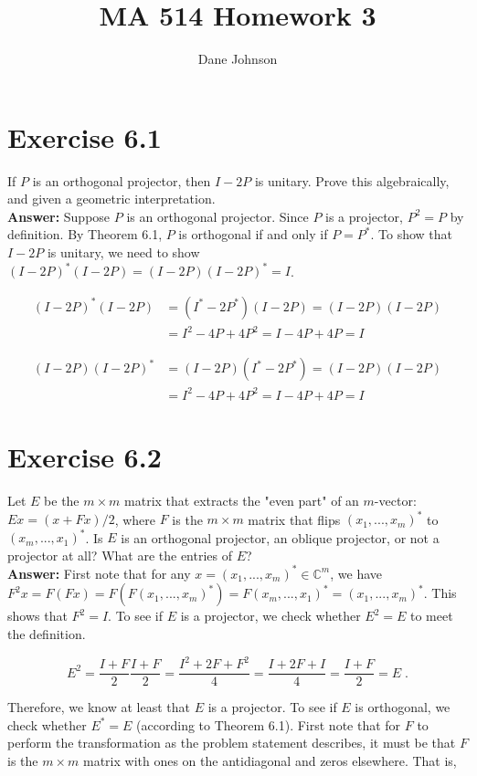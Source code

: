 \documentclass[11pt]{article}
\title{MA 514 Homework 3}
\author{Dane Johnson}
\begin{document}
\maketitle

\section*{Exercise 6.1}

If $P$ is an orthogonal projector, then $I-2P$ is unitary. Prove this algebraically, and given a geometric interpretation. \\

\textbf{Answer:} Suppose $P$ is an orthogonal projector. Since $P$ is a projector, $P^2 = P$ by definition. By Theorem 6.1, $P$ is orthogonal if and only if $P = P^*$. To show that $I-2P$ is unitary, we need to show $(I-2P)^*(I-2P) = (I-2P)(I-2P)^* = I$. 

\begin{align*}
(I-2P)^*(I-2P) &= (I^*-2P^*)(I-2P) = (I-2P)(I-2P) \\ &= I^2 - 4P +4P^2 = I-4P + 4P = I
\end{align*}

\begin{align*}
(I-2P)(I-2P)^* &= (I-2P)(I^*-2P^*) = (I-2P)(I-2P) \\ &= I^2 - 4P +4P^2 = I-4P + 4P = I
\end{align*}

\section*{Exercise 6.2}

Let $E$ be the $m\times m$ matrix that extracts the "even part" of an $m$-vector: $Ex = (x+Fx)/2$, where $F$ is the $m\times m$ matrix that flips $(x_1,...,x_m)^*$ to $(x_m,...,x_1)^*$. Is $E$ is an orthogonal projector, an oblique projector, or not a projector at all?  What are the entries of $E$? \\

\textbf{Answer:} First note that for any $x = (x_1,...,x_m)^* \in \mathbb{C}^m$, we have $F^2x = F(Fx) = F(F(x_1,...,x_m)^*) = F(x_m,...,x_1)^* = (x_1,...,x_m)^*$. This shows that $F^2 = I$. To see if $E$ is a projector, we check whether $E^2 = E$ to meet the definition.

$$E^2 = \frac{I+F}{2}\frac{I+F}{2} = \frac{I^2 + 2F + F^2}{4} = \frac{I +2F + I}{4} = \frac{I + F}{2} = E \;.$$

Therefore, we know at least that $E$ is a projector. To see if $E$ is orthogonal, we check whether $E^* = E$ (according to Theorem 6.1). First note that for $F$ to perform the transformation as the problem statement describes, it must be that $F$ is the $m\times m$ matrix with ones on the antidiagonal and zeros elsewhere. That is,
\end{document}
